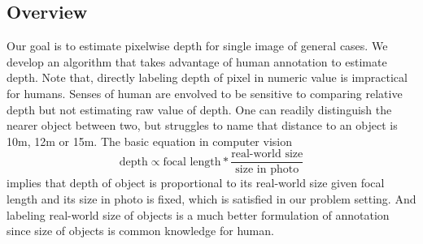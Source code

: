 \documentclass[10pt,twocolumn,letterpaper]{article}
\begin{document}
\subsection{Overview}
Our goal is to estimate pixelwise depth for single image of general cases. We develop an algorithm that takes advantage of human annotation to estimate depth. Note that, directly labeling depth of pixel in numeric value is impractical for humans. Senses of human are envolved to be sensitive to comparing relative depth but not estimating raw value of depth. One can readily distinguish the nearer object between two, but struggles to name that distance to an object is 10m, 12m or 15m. The basic equation in computer vision
\begin{equation}
\text{depth} \propto \text{focal\ length} * \frac{\text{real-world\ size}} {\text{size\ in\ photo}}
\end{equation}
implies that depth of object is proportional to its real-world size given focal length and its size in photo is fixed, which is satisfied in our problem setting. And labeling real-world size of objects is a much better formulation of annotation since size of objects is common knowledge for human.
\end{document}
